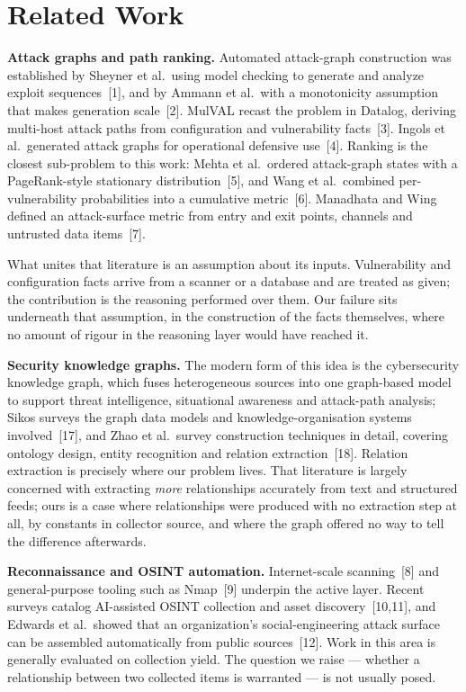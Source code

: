 \documentclass[11pt,a4paper]{article}
\begin{document}
\section{Related Work}
\textbf{Attack graphs and path ranking.} Automated attack-graph construction was established by Sheyner et al.\ using model checking to generate and analyze exploit sequences~[1], and by Ammann et al.\ with a monotonicity assumption that makes generation scale~[2]. MulVAL recast the problem in Datalog, deriving multi-host attack paths from configuration and vulnerability facts~[3]. Ingols et al.\ generated attack graphs for operational defensive use~[4]. Ranking is the closest sub-problem to this work: Mehta et al.\ ordered attack-graph states with a PageRank-style stationary distribution~[5], and Wang et al.\ combined per-vulnerability probabilities into a cumulative metric~[6]. Manadhata and Wing defined an attack-surface metric from entry and exit points, channels and untrusted data items~[7].

What unites that literature is an assumption about its inputs. Vulnerability and configuration facts arrive from a scanner or a database and are treated as given; the contribution is the reasoning performed over them. Our failure sits underneath that assumption, in the construction of the facts themselves, where no amount of rigour in the reasoning layer would have reached it.

\textbf{Security knowledge graphs.} The modern form of this idea is the cybersecurity knowledge graph, which fuses heterogeneous sources into one graph-based model to support threat intelligence, situational awareness and attack-path analysis; Sikos surveys the graph data models and knowledge-organisation systems involved~[17], and Zhao et al.\ survey construction techniques in detail, covering ontology design, entity recognition and relation extraction~[18]. Relation extraction is precisely where our problem lives. That literature is largely concerned with extracting \emph{more} relationships accurately from text and structured feeds; ours is a case where relationships were produced with no extraction step at all, by constants in collector source, and where the graph offered no way to tell the difference afterwards.

\textbf{Reconnaissance and OSINT automation.} Internet-scale scanning~[8] and general-purpose tooling such as Nmap~[9] underpin the active layer. Recent surveys catalog AI-assisted OSINT collection and asset discovery~[10,11], and Edwards et al.\ showed that an organization's social-engineering attack surface can be assembled automatically from public sources~[12]. Work in this area is generally evaluated on collection yield. The question we raise --- whether a relationship between two collected items is warranted --- is not usually posed.
\end{document}
